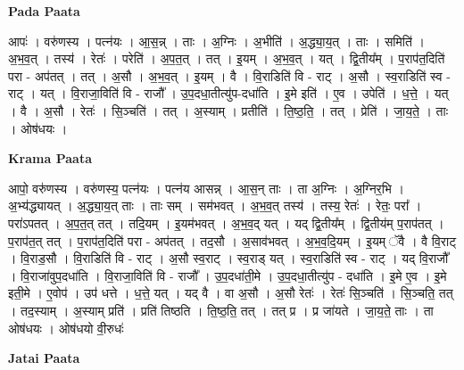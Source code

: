 \documentclass[17pt]{extarticle}
\begin{document}
\textbf{Pada Paata} \newline

आपः॑ । वरु॑णस्य । पत्न॑यः । आ॒स॒न्न् । ताः । अ॒ग्निः । अ॒भीति॑ । अ॒द्ध्या॒य॒त् । ताः । समिति॑ । अ॒भ॒व॒त् । तस्य॑ । रेतः॑ । परेति॑ । अ॒प॒त॒त् । तत् । इ॒यम् । अ॒भ॒व॒त् । यत् । द्वि॒तीय᳚म् । प॒राप॑त॒दिति॑ परा - अप॑तत् । तत् । अ॒सौ । अ॒भ॒व॒त् । इ॒यम् । वै । वि॒राडिति॑ वि - राट् । अ॒सौ । स्व॒राडिति॑ स्व - राट् । यत् । वि॒राजा॒विति॑ वि - राजौ᳚ । उ॒प॒दधा॒तीत्यु॑प-दधा॑ति । इ॒मे इति॑ । ए॒व । उपेति॑ । ध॒त्ते॒ । यत् । वै । अ॒सौ । रेतः॑ । सि॒ञ्चति॑ । तत् । अ॒स्याम् । प्रतीति॑ । ति॒ष्ठ॒ति॒ । तत् । प्रेति॑ । जा॒य॒ते॒ । ताः । ओष॑धयः ।  \newline


\textbf{Krama Paata} \newline

आपो॒ वरु॑णस्य । वरु॑णस्य॒ पत्न॑यः । पत्न॑य आसन्न् । आ॒स॒न् ताः । ता अ॒ग्निः । अ॒ग्निर॒भि । अ॒भ्य॑द्ध्यायत् । अ॒द्ध्या॒य॒त् ताः । ताः सम् । सम॑भवत् । अ॒भ॒व॒त् तस्य॑ । तस्य॒ रेतः॑ । रेतः॒ परा᳚ । परा॑ऽपतत् । अ॒प॒त॒त् तत् । तदि॒यम् । इ॒यम॑भवत् । अ॒भ॒व॒द् यत् । यद् द्वि॒तीय᳚म् । द्वि॒तीय॑म् प॒राप॑तत् । प॒राप॑त॒त् तत् । प॒राप॑त॒दिति॑ परा - अप॑तत् । तद॒सौ । अ॒साव॑भवत् । अ॒भ॒व॒दि॒यम् । इ॒यम् ॅवै । वै वि॒राट् । वि॒राड॒सौ । वि॒राडिति॑ वि - राट् । अ॒सौ स्व॒राट् । स्व॒राड् यत् । स्व॒राडिति॑ स्व - राट् । यद् वि॒राजौ᳚ । वि॒राजा॑वुप॒दधा॑ति । वि॒राजा॒विति॑ वि - राजौ᳚ । उ॒प॒दधा॑ती॒मे । उ॒प॒दधा॒तीत्यु॑प - दधा॑ति । इ॒मे ए॒व । इ॒मे इती॒मे । ए॒वोप॑ । उप॑ धत्ते । ध॒त्ते॒ यत् । यद् वै । वा अ॒सौ । अ॒सौ रेतः॑ । रेतः॑ सि॒ञ्चति॑ । सि॒ञ्चति॒ तत् । तद॒स्याम् । अ॒स्याम् प्रति॑ । प्रति॑ तिष्ठति । ति॒ष्ठ॒ति॒ तत् । तत् प्र । प्र जा॑यते । जा॒य॒ते॒ ताः । ता ओष॑धयः । ओष॑धयो वी॒रुधः॑ \newline

\textbf{Jatai Paata} \newline
\end{document}
